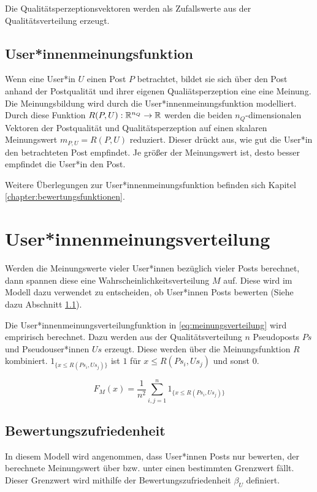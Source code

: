 Die Qualitätsperzeptionsvektoren werden als Zufallswerte aus der Qualitätsverteilung erzeugt.

\subsection{User*innenmeinungsfunktion}

Wenn eine User*in $U$ einen Post $P$ betrachtet, bildet sie sich über den Post anhand der Postqualität und ihrer eigenen Qualiätsperzeption eine eine Meinung. Die Meinungsbildung wird durch die User*innenmeinungsfunktion modelliert. Durch diese Funktion $R(P,U): \mathbb{R}^{n_Q} \rightarrow \mathbb{R} $ werden die beiden $n_Q$-dimensionalen Vektoren der Postqualität und Qualitätsperzeption auf einen skalaren Meinungswert $m_{P,U} = R(P,U)$ reduziert. Dieser drückt aus, wie gut die User*in den betrachteten Post empfindet. Je größer der Meinungswert ist, desto besser empfindet die User*in den Post.

Weitere Überlegungen zur User*innenmeinungsfunktion befinden sich Kapitel \ref{chapter:bewertungsfunktionen}.

\section{User*innenmeinungsverteilung} %


Werden die Meinungswerte vieler User*innen bezüglich vieler Posts berechnet, dann spannen diese eine Wahrscheinlichkeitsverteilung $M$ auf. Diese wird im Modell dazu verwendet zu entscheiden, ob User*innen Posts bewerten (Siehe dazu Abschnitt \ref{bewertungszufriedenheit}).

Die User*innenmeinungsverteilungfunktion in \ref{eq:meinungsverteilung} wird empririsch berechnet. Dazu werden aus der Qualitätsverteilung $n$ Pseudoposts $Ps$ und Pseudouser*innen $Us$ erzeugt. Diese werden über die Meinungsfunktion $R$ kombiniert. $1_{\{x \leq R(Ps_i,Us_j)\}}$ ist $1$ für $x \leq R(Ps_i,Us_j)$ und sonst $0$.

\begin{equation}
\label{eq:meinungsverteilung}
F_M(x) = \frac{1}{n^2}\sum_{i,j = 1}^{n} 1_{\{x \leq R(Ps_i,Us_j)\}}
\end{equation}


\subsection{Bewertungszufriedenheit}
\label{bewertungszufriedenheit}
In diesem Modell wird angenommen, dass User*innen Posts nur bewerten, der berechnete Meinungswert über bzw. unter einen bestimmten Grenzwert fällt. Dieser Grenzwert wird mithilfe der Bewertungszufriedenheit $\beta_U$ definiert.

